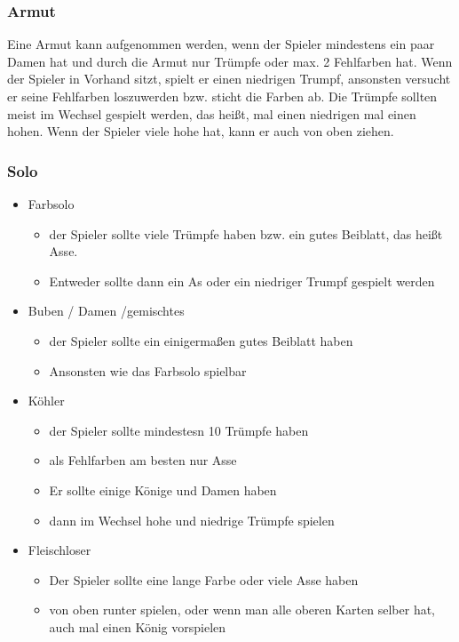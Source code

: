 \documentclass[12pt,a4paper]{article}
\begin{document}
\subsubsection{Armut}
Eine Armut kann aufgenommen werden, wenn der Spieler mindestens ein paar Damen hat und durch die Armut nur Trümpfe
oder max. 2 Fehlfarben hat. Wenn der Spieler in Vorhand sitzt, spielt er einen niedrigen Trumpf, ansonsten versucht er
seine Fehlfarben loszuwerden bzw. sticht die Farben ab. Die Trümpfe sollten meist im Wechsel gespielt werden, das heißt, mal einen
niedrigen mal einen hohen. Wenn der Spieler viele hohe hat, kann er auch von oben ziehen.
\subsubsection{Solo}
\begin{itemize}
\item Farbsolo
\begin{itemize}
\item der Spieler sollte viele Trümpfe haben bzw. ein gutes Beiblatt, das heißt Asse.
\item Entweder sollte dann ein As oder ein niedriger Trumpf gespielt werden
\end{itemize}
\item Buben / Damen /gemischtes
\begin{itemize}
\item der Spieler sollte ein einigermaßen gutes Beiblatt haben
\item Ansonsten wie das Farbsolo spielbar
\end{itemize}
\item Köhler
\begin{itemize}
\item der Spieler sollte mindestesn 10 Trümpfe haben
\item als Fehlfarben am besten nur Asse
\item Er sollte einige Könige und Damen haben
\item dann im Wechsel hohe und niedrige Trümpfe spielen
\end{itemize}
\item Fleischloser
\begin{itemize}
\item Der Spieler sollte eine lange Farbe oder viele Asse haben
\item von oben runter spielen, oder wenn man alle oberen Karten selber hat, auch mal einen König vorspielen
\end{itemize}
\end{itemize}
\newpage
\end{document}
